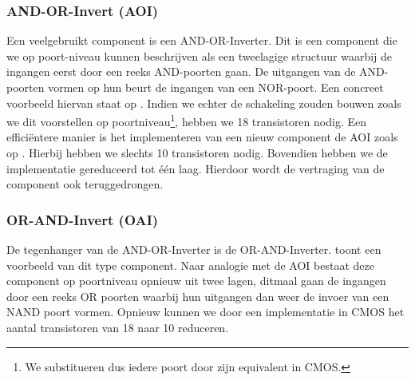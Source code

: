 \subsubsection{AND-OR-Invert (AOI)}
Een veelgebruikt component is een AND-OR-Inverter. Dit is een component die we op poort-niveau kunnen beschrijven als een tweelagige structuur waarbij de ingangen eerst door een reeks AND-poorten gaan. De uitgangen van de AND-poorten vormen op hun beurt de ingangen van een NOR-poort. Een concreet voorbeeld hiervan staat op . Indien we echter de schakeling zouden bouwen zoals we dit voorstellen op poortniveau\footnote{We substitueren dus iedere poort door zijn equivalent in CMOS.}, hebben we 18 transistoren nodig. Een effici\"entere manier is het implementeren van een nieuw component de AOI zoals op . Hierbij hebben we slechts 10 transistoren nodig. Bovendien hebben we de implementatie gereduceerd tot \'e\'en laag. Hierdoor wordt de vertraging van de component ook teruggedrongen.
\subsubsection{OR-AND-Invert (OAI)}
De tegenhanger van de AND-OR-Inverter is de OR-AND-Inverter.  toont een voorbeeld van dit type component. Naar analogie met de AOI bestaat deze component op poortniveau opnieuw uit twee lagen, ditmaal gaan de ingangen door een reeks OR poorten waarbij hun uitgangen dan weer de invoer van een NAND poort vormen. Opnieuw kunnen we door een implementatie in CMOS het aantal transistoren van 18 naar 10 reduceren.
